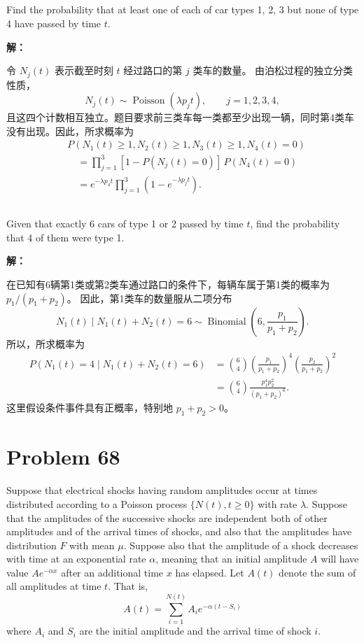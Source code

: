 \documentclass[12pt,a4paper]{article}
\begin{document}
\subsection{}

Find the probability that at least one of each of car types 1, 2, 3 but none of type 4 have passed by time $t$.
\begin{answerbox}
\textbf{解：}

令 $N_j(t)$ 表示截至时刻 $t$ 经过路口的第 $j$ 类车的数量。
由泊松过程的独立分类性质，
$$
N_j(t)\sim\operatorname{Poisson}(\lambda p_jt),\qquad j=1,2,3,4,
$$
且这四个计数相互独立。题目要求前三类车每一类都至少出现一辆，同时第4类车没有出现。因此，所求概率为
$$
\begin{aligned}
&P(N_1(t)\ge1,N_2(t)\ge1,N_3(t)\ge1,N_4(t)=0)\\
&\quad=\prod_{j=1}^3[1-P(N_j(t)=0)]\,P(N_4(t)=0)\\
&\quad=e^{-\lambda p_4t}\prod_{j=1}^3(1-e^{-\lambda p_jt}).
\end{aligned}
$$
\end{answerbox}

\subsection{}

Given that exactly 6 cars of type 1 or 2 passed by time $t$, find the probability that 4 of them were type 1.

\begin{answerbox}
\textbf{解：}

在已知有6辆第1类或第2类车通过路口的条件下，每辆车属于第1类的概率为 $p_1/(p_1+p_2)$。
因此，第1类车的数量服从二项分布
$$
N_1(t)\mid N_1(t)+N_2(t)=6
\sim\operatorname{Binomial}\left(6,\frac{p_1}{p_1+p_2}\right).
$$
所以，所求概率为
$$
\begin{aligned}
P(N_1(t)=4\mid N_1(t)+N_2(t)=6)
&=\binom64\left(\frac{p_1}{p_1+p_2}\right)^4
\left(\frac{p_2}{p_1+p_2}\right)^2\\
&=\binom64\frac{p_1^4p_2^2}{(p_1+p_2)^6}.
\end{aligned}
$$
这里假设条件事件具有正概率，特别地 $p_1+p_2>0$。
\end{answerbox}

\section{Problem 68}

Suppose that electrical shocks having random amplitudes occur at times distributed according to a Poisson process $\{N(t), t \ge 0\}$ with rate $\lambda$. Suppose that the amplitudes of the successive shocks are independent both of other amplitudes and of the arrival times of shocks, and also that the amplitudes have distribution $F$ with mean $\mu$. Suppose also that the amplitude of a shock decreases with time at an exponential rate $\alpha$, meaning that an initial amplitude $A$ will have value $Ae^{-\alpha x}$ after an additional time $x$ has elapsed. Let $A(t)$ denote the sum of all amplitudes at time $t$. That is,
$$
A(t)=\sum_{i=1}^{N(t)} A_i e^{-\alpha(t-S_i)}
$$
where $A_i$ and $S_i$ are the initial amplitude and the arrival time of shock $i$.
\end{document}
